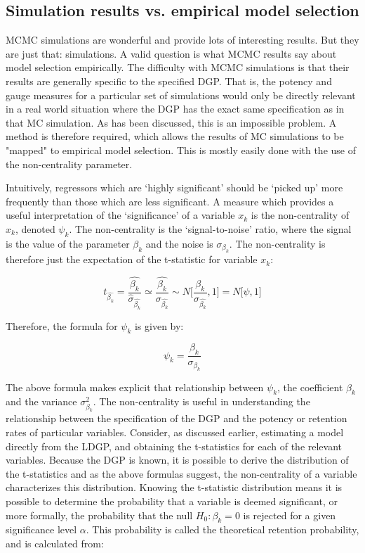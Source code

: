 \documentclass[11pt, oneside]{book}   	%
\begin{document}

\subsection{Simulation results vs. empirical model selection}

MCMC simulations are wonderful and provide lots of interesting results. But they are just that: simulations. A valid question is what MCMC results say about model selection empirically. The difficulty with MCMC simulations is that their results are generally specific to the specified DGP. That is, the potency and gauge measures for a particular set of simulations would only be directly relevant in a real world situation where the DGP has the exact same specification as in that MC simulation. As has been discussed, this is an impossible problem. A method is therefore required, which allows the results of MC simulations to be "mapped" to empirical model selection. This is mostly easily done with the use of the non-centrality parameter.

Intuitively, regressors which are `highly significant' should be `picked up' more frequently than those which are less significant. A measure which provides a useful interpretation of the `significance' of a variable $x_{k}$ is the non-centrality of $x_{k}$, denoted $\psi_{k}$. The non-centrality is the `signal-to-noise' ratio, where the signal is the value of the parameter $\beta_{k}$ and the noise is $\sigma_{\beta_{k}}$. The non-centrality is therefore just the expectation of the t-statistic for variable $x_{k}$:

$$t_{\hat{\beta_{k}}}=\frac{\hat{\beta_{k}}}{\hat{\sigma}_{\hat{\beta_{k}}}} \simeq \frac{\hat{\beta_{k}}}{\sigma_{\hat{\beta_{k}}}} \sim N \Bigg[\frac{\beta_{k}}{\sigma_{\hat{\beta_{k}}}}, 1 \Bigg] = N \big[\psi, 1 \big] $$

Therefore, the formula for $\psi_{k}$ is given by:

$$\psi_{k} = \frac{\beta_{k}}{\sigma_{\beta_{k}}}$$

The above formula makes explicit that relationship between $\psi_{k}$, the coefficient $\beta_{k}$ and the variance $\sigma_{\beta_{k}}^{2}$. The non-centrality is useful in understanding the relationship between the specification of the DGP and the potency or retention rates of particular variables. Consider, as discussed earlier, estimating a model directly from the LDGP, and obtaining the t-statistics for each of the relevant variables. Because the DGP is known, it is possible to derive the distribution of the t-statistics and as the above formulas suggest, the non-centrality of a variable characterizes this distribution. Knowing the t-statistic distribution means it is possible to determine the probability that a variable is deemed significant, or more formally, the probability that the null $H_{0}: \beta_{k} = 0$ is rejected for a given significance level $\alpha$. This probability is called the theoretical retention probability, and is calculated from:
\end{document}
